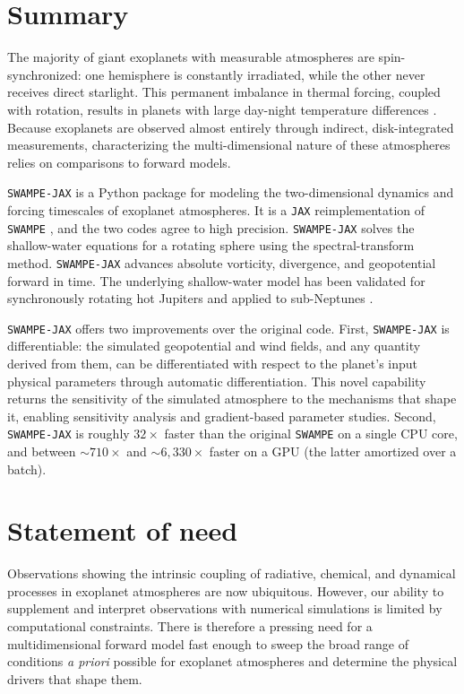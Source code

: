 \documentclass[10pt,a4paper,onecolumn]{article}
\begin{document}
\section{Summary}

The majority of giant exoplanets with measurable atmospheres are spin-synchronized: one hemisphere is constantly irradiated, while the other never receives direct starlight. This permanent imbalance in thermal forcing, coupled with rotation, results in planets with large day-night temperature differences \citep{Showman:2009}. Because exoplanets are observed almost entirely through indirect, disk-integrated measurements, characterizing the multi-dimensional nature of these atmospheres relies on comparisons to forward models.

\texttt{SWAMPE-JAX} is a Python package for modeling the two-dimensional dynamics and forcing timescales of exoplanet atmospheres. It is a \texttt{JAX} \citep{jax:2018} reimplementation of \texttt{SWAMPE} \citep{Landgren:2022}, and the two codes agree to high precision. \texttt{SWAMPE-JAX} solves the shallow-water equations for a rotating sphere using the spectral-transform method. \texttt{SWAMPE-JAX} advances absolute vorticity, divergence, and geopotential forward in time. The underlying shallow-water model has been validated for synchronously rotating hot Jupiters and applied to sub-Neptunes \citep{Landgren:2022, Landgren:2023}.

\texttt{SWAMPE-JAX} offers two improvements over the original code. First, \texttt{SWAMPE-JAX} is differentiable: the simulated geopotential and wind fields, and any quantity derived from them, can be differentiated with respect to the planet's input physical parameters through automatic differentiation. This novel capability returns the sensitivity of the simulated atmosphere to the mechanisms that shape it, enabling sensitivity analysis and gradient-based parameter studies. Second, \texttt{SWAMPE-JAX} is roughly $32\times$ faster than the original \texttt{SWAMPE} on a single CPU core, and between ${\sim}710\times$ and ${\sim}6{,}330\times$ faster on a GPU (the latter amortized over a batch).

\section{Statement of need}
Observations showing the intrinsic coupling of radiative, chemical, and dynamical processes in exoplanet atmospheres are now ubiquitous. However, our ability to supplement and interpret observations with numerical simulations is limited by computational constraints. There is therefore a pressing need for a multidimensional forward model fast enough to sweep the broad range of conditions \textit{a priori} possible for exoplanet atmospheres and determine the physical drivers that shape them.
\end{document}
